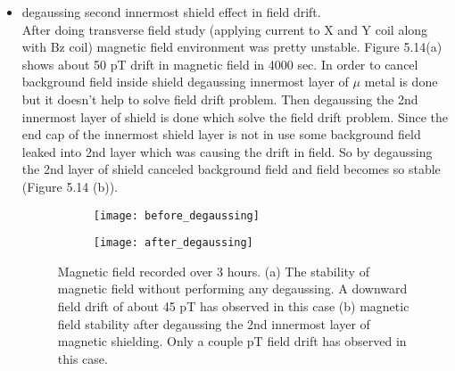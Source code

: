 \documentclass[12pt]{report}
\begin{document}
\begin{itemize}
   \item degaussing second innermost shield effect in field drift.\\
   After doing transverse field study (applying current to X and Y coil along with Bz coil) magnetic field environment was pretty unstable. Figure 5.14(a) shows about 50 pT drift in magnetic field in 4000 sec. In order to cancel background field inside shield degaussing innermost layer of $\mu$ metal is done but it doesn't help to solve field drift problem. Then degaussing the 2nd innermost layer of shield is done which solve the field drift problem. Since the end cap of the innermost shield layer is not in use some background field leaked into 2nd layer which was causing the drift in field. So by degaussing the 2nd layer of shield canceled background field and field becomes so stable (Figure 5.14 (b)).
   
  \begin{figure}
    \centering
 
    \begin{subfigure}[b]{0.45\textwidth}
        \centering
        \texttt{[image: before\_degaussing]}
        \caption{}
        \label{fig:three sin x}
    \end{subfigure}
    \hfill
    \begin{subfigure}[b]{0.45\textwidth}
        \centering
        \texttt{[image: after\_degaussing]}
        \caption{}
        \label{fig:five over x}
    \end{subfigure}
    \caption{ Magnetic field recorded over 3 hours. (a) The stability of magnetic field without performing any degaussing. A downward field drift of about 45 pT  has observed in this case (b) magnetic field stability after degaussing the 2nd innermost layer of magnetic shielding. Only a couple pT field drift has observed in this case.}
    \label{fig:three graphs}
\end{figure}
   \end{itemize}
   \newpage
\end{document}
